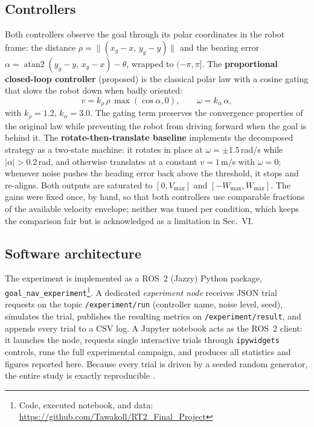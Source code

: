 \documentclass[conference]{IEEEtran}
\begin{document}
\subsection{Controllers}
Both controllers observe the goal through its polar coordinates in the robot
frame: the distance $\rho=\|(x_g-x,\,y_g-y)\|$ and the bearing error
$\alpha=\operatorname{atan2}(y_g-y,\,x_g-x)-\theta$, wrapped to
$(-\pi,\pi]$. The \textbf{proportional closed-loop controller} (proposed) is
the classical polar law \cite{aicardi1995closed} with a cosine gating that
slows the robot down when badly oriented:
\begin{equation}
v = k_\rho\,\rho\,\max(\cos\alpha,0),\qquad
\omega = k_\alpha\,\alpha ,
\end{equation}
with $k_\rho=1.2$, $k_\alpha=3.0$. The gating term preserves the convergence
properties of the original law while preventing the robot from driving
forward when the goal is behind it. The \textbf{rotate-then-translate
baseline} implements the decomposed strategy as a two-state machine: it
rotates in place at $\omega=\pm1.5$\,rad/s while $|\alpha|>0.2$\,rad, and
otherwise translates at a constant $v=1$\,m/s with $\omega=0$; whenever noise
pushes the heading error back above the threshold, it stops and re-aligns.
Both outputs are saturated to $[0,V_{\max}]$ and $[-W_{\max},W_{\max}]$. The
gains were fixed once, by hand, so that both controllers use comparable
fractions of the available velocity envelope; neither was tuned per
condition, which keeps the comparison fair but is acknowledged as a
limitation in Sec.~VI.

\subsection{Software architecture}
The experiment is implemented as a ROS~2 (Jazzy) Python package,
\texttt{goal\_nav\_experiment}\footnote{Code, executed notebook, and data:
\url{https://github.com/Tawakoll/RT2_Final_Project}}. A dedicated
\emph{experiment node} receives JSON trial requests on the topic
\texttt{/experiment/run} (controller name, noise level, seed), simulates the
trial, publishes the resulting metrics on \texttt{/experiment/result}, and
appends every trial to a CSV log. A Jupyter notebook acts as the ROS~2 client:
it launches the node, requests single interactive trials through
\texttt{ipywidgets} controls, runs the full experimental campaign, and
produces all statistics and figures reported here. Because every trial is
driven by a seeded random generator, the entire study is exactly
reproducible \cite{kluyver2016jupyter}.
\end{document}
